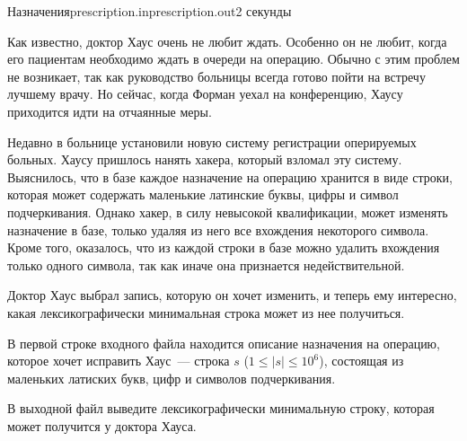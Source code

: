 \begin{problem}{Назначения}{prescription.in}{prescription.out}{2 секунды}



Как известно, доктор Хаус очень не любит ждать. Особенно он не любит, когда его
пациентам необходимо ждать в очереди на операцию. Обычно с этим проблем не возникает,
так как руководство больницы всегда готово пойти на встречу лучшему врачу. Но сейчас,
когда Форман уехал на конференцию, Хаусу приходится идти на отчаянные меры.

Недавно в больнице установили новую систему регистрации оперируемых больных. Хаусу 
пришлось нанять хакера, который взломал эту систему. Выяснилось, что в базе
каждое назначение на операцию хранится в виде строки, которая может содержать 
маленькие латинские буквы, цифры и символ подчеркивания. Однако хакер, в силу 
невысокой квалификации, может изменять назначение в базе, только удаляя из него 
все вхождения некоторого символа. Кроме того, оказалось, что из каждой строки в базе 
можно удалить вхождения только одного символа, так как иначе она признается недействительной.

Доктор Хаус выбрал запись, которую он хочет изменить, и теперь ему интересно, какая
лексикографически минимальная строка может из нее получиться.

\InputFile
В первой строке входного файла находится описание назначения на операцию, которое хочет исправить 
Хаус~--- строка  $s$ ($1 \le |s| \le 10^6$), состоящая из маленьких латиских букв, 
цифр и символов подчеркивания.

\OutputFile               
В выходной файл выведите лексикографически минимальную строку, которая может получится 
у доктора Хауса.

\Examples
\begin{example}%
%
%
\end{example}

\end{problem}
